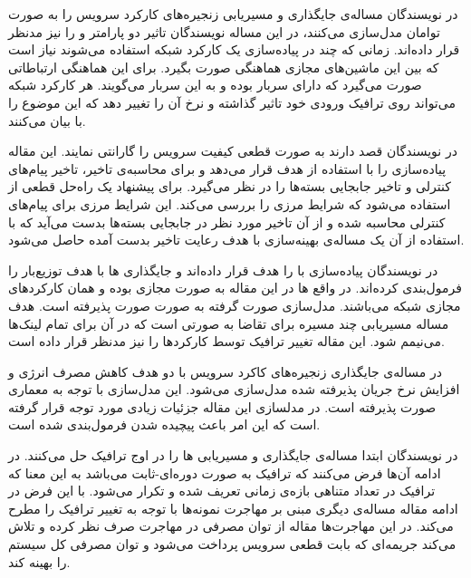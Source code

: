 در \cite{Huang2017}
نویسندگان مساله‌ی جایگذاری و مسیریابی زنجیره‌های کارکرد سرویس را به صورت توامان مدل‌سازی می‌کنند،
در این مساله نویسندگان تاثیر دو پارامتر  و 
را نیز مدنظر قرار داده‌اند.
زمانی که چند  در پیاده‌سازی یک کارکرد شبکه استفاده می‌شوند
نیاز است که بین این ماشین‌های مجازی هماهنگی صورت بگیرد.
برای این هماهنگی ارتباطاتی صورت می‌گیرد که دارای سربار بوده و به این سربار
 می‌گویند.
هر کارکرد شبکه می‌تواند روی ترافیک ورودی خود تاثیر گذاشته و نرخ آن را تغییر دهد
که این موضوع را با  بیان می‌کنند.

در \cite{Chen2017}
نویسندگان قصد دارند به صورت قطعی کیفیت سرویس را گارانتی نمایند.
این مقاله پیاده‌سازی  را با استفاده از  هدف قرار می‌دهد
و برای محاسبه‌ی تاخیر، تاخیر پیام‌های کنترلی  و
تاخیر جابجایی بسته‌ها را در نظر می‌گیرد.
برای پیشنهاد یک راه‌حل قطعی از 
استفاده می‌شود که شرایط مرزی را بررسی می‌کند.
این شرایط مرزی برای پیام‌های کنترلی محاسبه شده
و از آن تاخیر مورد نظر در جابجایی بسته‌ها بدست می‌آید
که با استفاده از آن یک مساله‌ی بهینه‌سازی با هدف رعایت تاخیر بدست آمده حاصل می‌شود.

در \cite{Ma2017}
نویسندگان پیاده‌سازی  با 
را هدف قرار داده‌اند و جایگذاری ها
با هدف توزیع‌بار را فرمول‌بندی کرده‌اند.
در واقع ها
در این مقاله به صورت مجازی بوده و همان کارکردهای مجازی شبکه می‌باشند.
مدل‌سازی صورت گرفته به صورت  صورت پذیرفته است.
هدف مساله مسیریابی چند مسیره برای تقاضا به صورتی است که در آن
 برای تمام لینک‌ها می‌نیمم شود.
این مقاله تغییر ترافیک توسط کارکردها را نیز مدنظر قرار داده است.

در \cite{Jang2017}
مساله‌ی جایگذاری زنجیره‌های کاکرد سرویس با دو هدف کاهش مصرف انرژی و افزایش نرخ جریان پذیرفته شده
مدل‌سازی می‌شود. این مدل‌سازی با توجه به معماری  صورت پذیرفته است.
در مدلسازی این مقاله جزئیات زیادی مورد توجه قرار گرفته است که این امر باعث پیچیده شدن
فرمول‌بندی شده است.

در \cite{Eramo2017}
نویسندگان ابتدا مساله‌ی جایگذاری و مسیریابی ها را
در اوج ترافیک حل می‌کنند. در ادامه آن‌ها فرض می‌کنند که ترافیک به صورت دوره‌ای-ثابت می‌باشد
به این معنا که ترافیک در تعداد متناهی بازه‌ی زمانی تعریف شده و تکرار می‌شود.
با این فرض در ادامه مقاله مساله‌ی دیگری مبنی بر مهاجرت نمونه‌ها با توجه به تغییر ترافیک را مطرح می‌کند.
در این مهاجرت‌ها مقاله از توان مصرفی در مهاجرت صرف نظر کرده و تلاش می‌کند جریمه‌ای که بابت قطعی سرویس پرداخت می‌شود
و توان مصرفی کل سیستم را بهینه کند.

